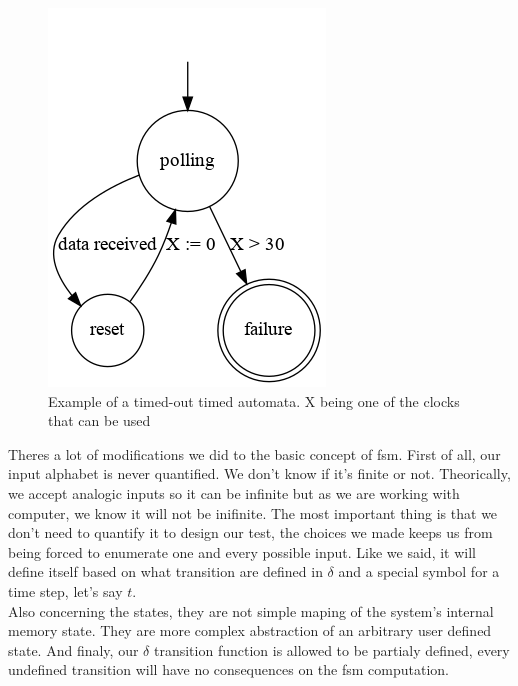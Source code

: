 \documentclass[12pt]{article}
\begin{document}
\begin{figure}
    \centering
    \includegraphics[scale=0.8]{timed_automata.png}
    \caption{Example of a timed-out timed automata. X being one of the clocks that can be used}
    \label{timed_automata_e1}
\end{figure}

Theres a lot of modifications we did to the basic concept of \gls{fsm}. First of all, our input alphabet is never quantified. We don't know if it's finite or not. Theorically, we accept analogic inputs so it can be infinite but as we are working with computer, we know it will not be inifinite. The most important thing is that we don't need to quantify it to design our test, the choices we made keeps us from being forced to enumerate one and every possible input. Like we said, it will define itself based on what transition are defined in $\delta$ and a special symbol for a time step, let's say $t$.\\

Also concerning the states, they are not simple maping of the system's internal memory state. They are more complex abstraction of an arbitrary user defined state. And finaly, our $\delta$ transition function is allowed to be partialy defined, every undefined transition will have no consequences on the \gls{fsm} computation.


\end{document}
